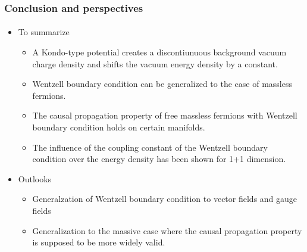 \documentclass[english]{beamer}
\begin{document}
\begin{frame}[shrink=0]
\frametitle{Conclusion and perspectives}
\framesubtitle{}

\begin{itemize}
\item<1-> To summarize
	\begin{itemize}
	\item<2-> A Kondo-type potential creates a discontiunuous background vacuum charge density and shifts the vacuum energy density by a constant.
	\item<3-> Wentzell boundary condition can be generalized to the case of massless fermions.
	\item<4-> The causal propagation property of free massless fermions with Wentzell boundary condition holds on certain manifolds.
	\item<5-> The influence of the coupling constant of the Wentzell boundary condition over the energy density has been shown for 1+1 dimension.
	\end{itemize}
\item<6-> Outlooks
	\begin{itemize}
	\item Generalzation of Wentzell boundary condition to vector fields and gauge fields
	\item Generalization to the massive case where the causal propagation property is supposed to be more widely valid.
	\end{itemize}
\end{itemize}
\end{frame}
\end{document}
